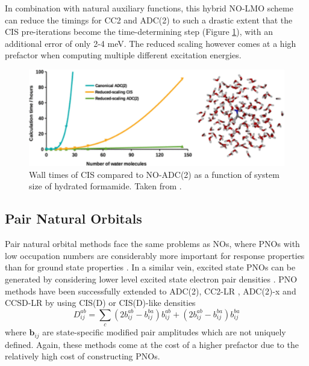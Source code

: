 In combination with natural auxiliary functions, this hybrid NO-LMO scheme can reduce the timings for CC2 and ADC(2) to such a drastic extent that the CIS pre-iterations become the time-determining step (Figure \ref{fig:MESTER}), with an additional error of only 2-4 meV. The reduced scaling however comes at a high prefactor when computing multiple different excitation energies. 

\begin{figure}
\centering
\includegraphics[scale=1.0]{Pics/mester_adc.png}
\caption[Wall times of CIS compared to NO-ADC(2) as a function of system size of hydrated formamide.]{Wall times of CIS compared to NO-ADC(2) as a function of system size of hydrated formamide. Taken from \cite{Mes2019}.}
\label{fig:MESTER}
\end{figure}


\subsection{Pair Natural Orbitals}

Pair natural orbital methods face the same problems as NOs, where PNOs with low occupation numbers are considerably more important for response properties than for ground state properties \cite{McA2016}. In a similar vein, excited state PNOs can be generated by considering lower level excited state electron pair densities \cite{Hel2011}. PNO methods have been successfully extended to ADC(2), CC2-LR \cite{Hel2013}, ADC(2)-x \cite{Hel2014} and CCSD-LR \cite{Fra2018} by using CIS(D) or CIS(D)-like densities
\begin{equation}
D_{ij}^{ab} = \sum_c \left( 2b_{ij}^{ab} - b_{ij}^{ba} \right) b_{ij}^{ab} + \left( 2b_{ij}^{ab} - b_{ij}^{ba} \right) b_{ij}^{ba}
\end{equation}
\noindent where $\mathbf{b}_{ij}$ are state-specific modified pair amplitudes which are not uniquely defined. Again, these methods come at the cost of a higher prefactor due to the relatively high cost of constructing PNOs. %


